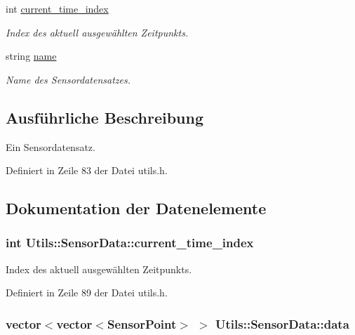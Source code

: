 \begin{DoxyCompactItemize}
int \hyperlink{structUtils_1_1SensorData_a177d53154d56fcf1962f969ece1e7d9d}{current\-\_\-time\-\_\-index}
\begin{DoxyCompactList}\small\item\em Index des aktuell ausgewählten Zeitpunkts. \end{DoxyCompactList}\item 
string \hyperlink{structUtils_1_1SensorData_a52474d0fe0dce0d3ee73c007a150a507}{name}
\begin{DoxyCompactList}\small\item\em Name des Sensordatensatzes. \end{DoxyCompactList}\end{DoxyCompactItemize}


\subsection{Ausführliche Beschreibung}
Ein Sensordatensatz. 

Definiert in Zeile 83 der Datei utils.\-h.



\subsection{Dokumentation der Datenelemente}
\hypertarget{structUtils_1_1SensorData_a177d53154d56fcf1962f969ece1e7d9d}{
\subsubsection[{current\-\_\-time\-\_\-index}]{\setlength{\rightskip}{0pt plus 5cm}int Utils\-::\-Sensor\-Data\-::current\-\_\-time\-\_\-index}}\label{structUtils_1_1SensorData_a177d53154d56fcf1962f969ece1e7d9d}


Index des aktuell ausgewählten Zeitpunkts. 



Definiert in Zeile 89 der Datei utils.\-h.

\hypertarget{structUtils_1_1SensorData_ae94e7645dc0b6adfd21571b0abd5e309}{
\subsubsection[{data}]{\setlength{\rightskip}{0pt plus 5cm}vector$<$vector$<${\bf Sensor\-Point}$>$ $>$ Utils\-::\-Sensor\-Data\-::data}}\label{structUtils_1_1SensorData_ae94e7645dc0b6adfd21571b0abd5e309}


